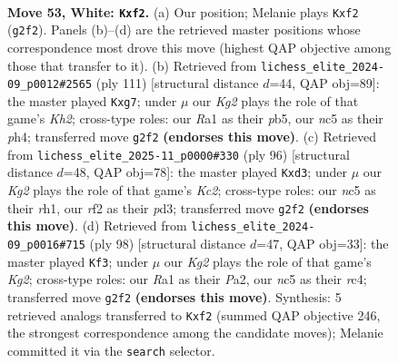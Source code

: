 \documentclass[11pt]{article}
\begin{document}
\clearpage

\begin{figure}[p]\centering
\begin{subfigure}{0.46\textwidth}\centering
\resizebox{\linewidth}{!}{%
\newchessgame
\chessboard[
  setfen={6k1/p7/1p6/2n1Qp1q/P1p5/6P1/1P3rK1/R7 w - - 0 53},
  showmover=false,
  pgfstyle=straightmove, color=movearrow, markmove={g2-f2}
]}
\caption{}
\end{subfigure}\hfill
\begin{subfigure}{0.46\textwidth}\centering
\resizebox{\linewidth}{!}{%
\newchessgame
\chessboard[
  setfen={4Q3/2p3Rk/8/1PpPp3/p4p1P/P7/KPq5/8 b - - 0 56},
  showmover=false,
  pgfstyle=straightmove, color=movearrow, markmove={h7-g7}
]}
\caption{}
\end{subfigure}
\\[4pt]
\begin{subfigure}{0.46\textwidth}\centering
\resizebox{\linewidth}{!}{%
\newchessgame
\chessboard[
  setfen={8/k7/1p4P1/p2p4/1q3P2/1P1pQ3/P1K3R1/7r w - - 0 49},
  showmover=false,
  pgfstyle=straightmove, color=movearrow, markmove={c2-d3}
]}
\caption{}
\end{subfigure}\hfill
\begin{subfigure}{0.46\textwidth}\centering
\resizebox{\linewidth}{!}{%
\newchessgame
\chessboard[
  setfen={8/p5r1/1p1k4/3p3P/1Pr5/3QP3/P4PK1/8 w - - 1 50},
  showmover=false,
  pgfstyle=straightmove, color=movearrow, markmove={g2-f3}
]}
\caption{}
\end{subfigure}
\caption{\textbf{Move 53, White: \texttt{Kxf2}.} (a) Our position; Melanie plays \texttt{Kxf2} (\texttt{g2f2}). Panels (b)--(d) are the retrieved master positions whose correspondence most drove this move (highest QAP objective among those that transfer to it). (b) Retrieved from \texttt{lichess\_elite\_2024-09\_p0012\#2565} (ply 111) [structural distance $d$=44, QAP obj=89]: the master played \texttt{Kxg7}; under $\mu$ our \emph{Kg2} plays the role of that game's \emph{Kh2}; cross-type roles: our \emph{R}a1 as their \emph{p}b5, our \emph{n}c5 as their \emph{p}h4; transferred move \texttt{g2f2} \textbf{(endorses this move)}. (c) Retrieved from \texttt{lichess\_elite\_2025-11\_p0000\#330} (ply 96) [structural distance $d$=48, QAP obj=78]: the master played \texttt{Kxd3}; under $\mu$ our \emph{Kg2} plays the role of that game's \emph{Kc2}; cross-type roles: our \emph{n}c5 as their \emph{r}h1, our \emph{r}f2 as their \emph{p}d3; transferred move \texttt{g2f2} \textbf{(endorses this move)}. (d) Retrieved from \texttt{lichess\_elite\_2024-09\_p0016\#715} (ply 98) [structural distance $d$=47, QAP obj=33]: the master played \texttt{Kf3}; under $\mu$ our \emph{Kg2} plays the role of that game's \emph{Kg2}; cross-type roles: our \emph{R}a1 as their \emph{P}a2, our \emph{n}c5 as their \emph{r}c4; transferred move \texttt{g2f2} \textbf{(endorses this move)}. Synthesis: 5 retrieved analogs transferred to \texttt{Kxf2} (summed QAP objective 246, the strongest correspondence among the candidate moves); Melanie committed it via the \texttt{search} selector.}
\label{fig:thought-m104}
\end{figure}
\end{document}
